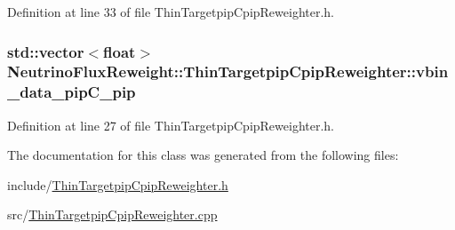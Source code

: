 Definition at line 33 of file Thin\-Targetpip\-Cpip\-Reweighter.\-h.

\hypertarget{class_neutrino_flux_reweight_1_1_thin_targetpip_cpip_reweighter_a163f6f641a9673db0d5d17abd9675c20}{
\subsubsection[{vbin\-\_\-data\-\_\-pip\-C\-\_\-pip}]{\setlength{\rightskip}{0pt plus 5cm}std\-::vector$<$float$>$ Neutrino\-Flux\-Reweight\-::\-Thin\-Targetpip\-Cpip\-Reweighter\-::vbin\-\_\-data\-\_\-pip\-C\-\_\-pip}}\label{class_neutrino_flux_reweight_1_1_thin_targetpip_cpip_reweighter_a163f6f641a9673db0d5d17abd9675c20}


Definition at line 27 of file Thin\-Targetpip\-Cpip\-Reweighter.\-h.



The documentation for this class was generated from the following files\-:\begin{DoxyCompactItemize}
\item 
include/\hyperlink{_thin_targetpip_cpip_reweighter_8h}{Thin\-Targetpip\-Cpip\-Reweighter.\-h}\item 
src/\hyperlink{_thin_targetpip_cpip_reweighter_8cpp}{Thin\-Targetpip\-Cpip\-Reweighter.\-cpp}\end{DoxyCompactItemize}
